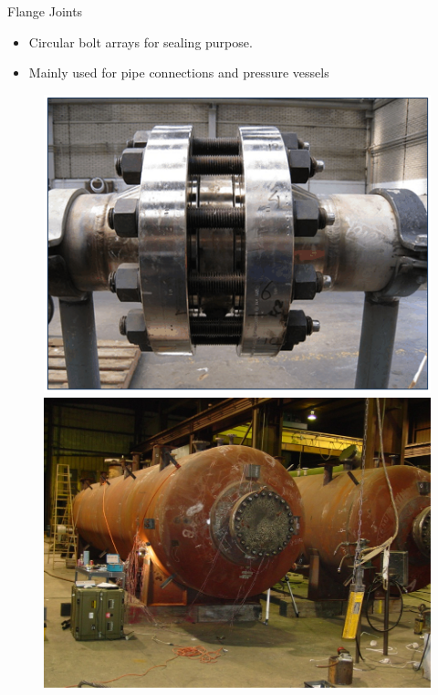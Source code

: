 \documentclass[10pt, svgnames]{beamer}
\begin{document}
\begin{frame}[label={sec:orgfbc900e}]{Flange Joints}
\begin{itemize}
\item Circular bolt arrays for sealing purpose.
\item Mainly used for pipe connections and pressure vessels
\end{itemize}
\begin{figure}[h]
  \centering
  \includegraphics[height=0.45\textheight]{pictures/pipe-connection}
  \includegraphics[height=0.45\textheight]{pictures/pressure-vessel}
\end{figure}
\end{frame}
\end{document}
